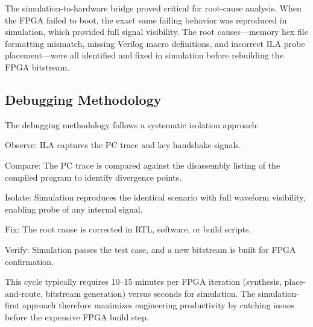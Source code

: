 The simulation-to-hardware bridge proved critical for root-cause analysis. When the FPGA failed to boot, the exact same failing behavior was reproduced in simulation, which provided full signal visibility. The root causes—memory hex file formatting mismatch, missing Verilog macro definitions, and incorrect ILA probe placement—were all identified and fixed in simulation before rebuilding the FPGA bitstream.

\subsection{Debugging Methodology}

The debugging methodology follows a systematic isolation approach:

Observe: ILA captures the PC trace and key handshake signals.

Compare: The PC trace is compared against the disassembly listing of the compiled program to identify divergence points.

Isolate: Simulation reproduces the identical scenario with full waveform visibility, enabling probe of any internal signal.

Fix: The root cause is corrected in RTL, software, or build scripts.

Verify: Simulation passes the test case, and a new bitstream is built for FPGA confirmation.

This cycle typically requires 10–15 minutes per FPGA iteration (synthesis, place-and-route, bitstream generation) versus seconds for simulation. The simulation-first approach therefore maximizes engineering productivity by catching issues before the expensive FPGA build step.
